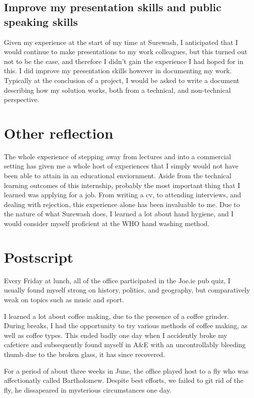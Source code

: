     \subsection{Improve my presentation skills and public speaking skills} Given my experience at the start of my time at Surewash, I anticipated that I would continue to make presentations to my work colleagues, but this turned out not to be the case, and therefore I didn't gain the experience I had hoped for in this. I did improve my presentation skills however in documenting my work. Typically at the conclusion of a project, I would be asked to write a document describing how my solution works, both from a technical, and non-technical perspective.

\section{Other reflection}
The whole experience of stepping away from lectures and into a commercial setting has given me a whole host of experiences that I simply would not have been able to attain in an educational enviornment. Aside from the technical learning outcomes of this internship, probably the most important thing that I learned was applying for a job. From writing a cv, to attending interviews, and dealing with rejection, this experience alone has been invaluable to me. Due to the nature of what Surewash does, I learned a lot about hand hygiene, and I would consider myself proficient at the WHO hand washing method.

\section{Postscript}
Every Friday at lunch, all of the office participated in the Joe.ie pub quiz, I usually found myself strong on history, politics, and geography, but comparatively weak on topics such as music and sport.

I learned a lot about coffee making, due to the presence of a coffee grinder. During breaks, I had the opportunity to try various methods of coffee making, as well as coffee types. This ended badly one day when I accidently broke my cafetiere and subsequently found myself in A\&E with an uncontrollably bleeding thumb due to the broken glass, it has since recovered.

For a period of about three weeks in June, the office played host to a fly who was affectionatly called Bartholomew. Despite best efforts, we failed to git rid of the fly, he dissapeared in mysterious circumstances one day.